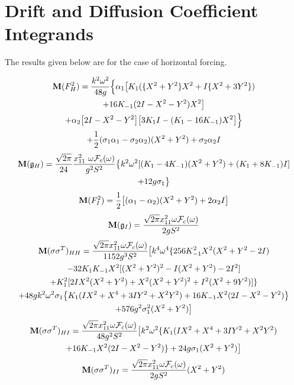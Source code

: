 \section{Drift and Diffusion Coefficient Integrands}
\label{a:drift and diffusion coefficient integrands}

The results given below are for the case of horizontal forcing.

\begin{multline}
\operatorname{\mathbf M}(F^2_H) = \frac{k^2 \omega^2}{48 g}\Big\{\alpha_1 \big[K_1 (\{X^2 + Y^2\} X^2 + I\{X^2 + 3Y^2\})\\
+ 16 K_{-1} (2I - X^2 - Y^2) X^2\big]\\
+ \alpha_2 \big[2I - X^2 - Y^2\big] \big[3 K_1 I - (K_1 - 16 K_{-1}) X^2 \big]\Big\}\\
+ \frac12 (\sigma_1 \alpha_1 - \sigma_2 \alpha_2) (X^2 + Y^2) + \sigma_2 \alpha_2 I
\end{multline}
\begin{multline}
\operatorname{\mathbf M}(\mathfrak{g}_H) = \frac{\sqrt{2 \pi}}{24} \frac{x_{11}^2 \ \omega \mathcal{F}_c(\omega)}{g^2 S^2} \big\{k^2 \omega^2 [(K_1 - 4 K_{-1})(X^2 + Y^2) + (K_1 + 8 K_{-1}) I ]\\
+ 12 g \sigma_1 \big\}
\end{multline}
\begin{equation}
\operatorname{\mathbf M}(F^2_I) = \frac12 \big[(\alpha_1 - \alpha_2) (X^2+Y^2) + 2 \alpha_2 I \big]
\end{equation}
\begin{equation}
\operatorname{\mathbf M}(\mathfrak{g}_I) = \frac{\sqrt{2 \pi} x^2_{11} \omega \mathcal{F}_c(\omega)}{2 g S^2}
\end{equation}
\begin{multline}
\operatorname{\mathbf M}(\sigma \sigma^T)_{HH} = \frac{\sqrt{2 \pi} x^2_{11} \omega \mathcal{F}_c(\omega)}{1152 g^3 S^2}\big[k^4 \omega^4 \{256
K_{-1}^2 X^2 (X^2 + Y^2 - 2I)\\
- 32 K_1 K_{-1} X^2 [(X^2+Y^2)^2 - I(X^2+Y^2) - 2I^2]\\+ K_1^2 [2IX^2(X^2 + Y^2) + X^2(X^2 + Y^2)^2 + I^2(X^2 + 9Y^2)] \}\\
+ 48 g k^2 \omega^2 \sigma_1 \big\{K_1(IX^2 + X^4 + 3 I Y^2 + X^2 Y^2) + 16 K_{-1} X^2 (2I - X^2 - Y^2) \big\}\\
+ 576 g^2 \sigma_1^2(X^2 + Y^2) \big]
\end{multline}
\begin{multline}
\operatorname{\mathbf M}(\sigma \sigma^T)_{HI} = \frac{\sqrt{2\pi} x_{11}^2 \omega \mathcal{F}_c(\omega)}{48 g^2 S^2} \big[k^2 \omega^2 \{K_1 (I X^2 + X^4 + 3IY^2 + X^2Y^2)\\
+ 16 K_{-1} X^2 (2I - X^2 - Y^2)\} + 24 g \sigma_1 (X^2 + Y^2) \big]
\end{multline}
\begin{equation}
\operatorname{\mathbf M}(\sigma \sigma^T)_{II} = \frac{\sqrt{2 \pi} x^2_{11}
\omega \mathcal{F}_c(\omega )}{2 g S^2} (X^2 + Y^2)
\end{equation}
